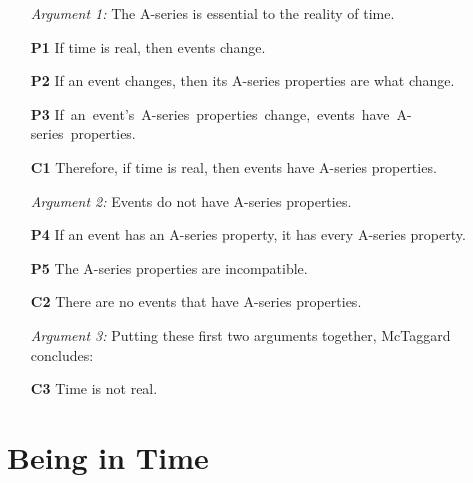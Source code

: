 \documentclass[a4paper, 11pt]{article} %
\begin{document}
\begin{itemize}
  \item[\it Argument 1:] The A-series is essential to the reality of time.
    \item[\bf P1] If time is real, then events change.
    \item[\bf P2] If an event changes, then its A-series properties are what change.
    \item[\bf P3] \mbox{If an event's A-series properties change, events have A-series properties.}
    \item[\bf C1] Therefore, if time is real, then events have A-series properties.
  \item[\it Argument 2:] Events do not have A-series properties.
    \item[\bf P4] If an event has an A-series property, it has every A-series property.
    \item[\bf P5] The A-series properties are incompatible.
    \item[\bf C2] There are no events that have A-series properties. 
  \item[\it Argument 3:] Putting these first two arguments together, McTaggard concludes:
    \item[\bf C3] Time is not real.
\end{itemize}





\section*{Being in Time}
\end{document}
